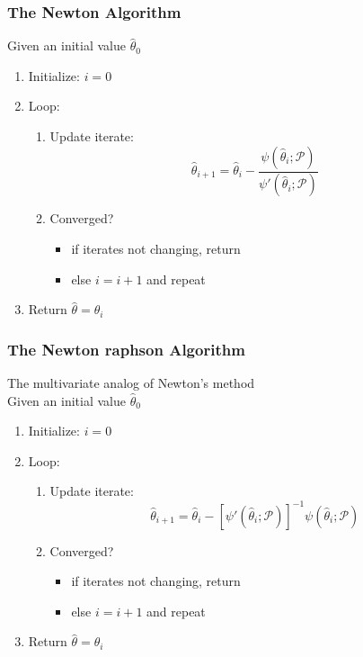 \documentclass[11pt]{article}
\begin{document}
\subsubsection*{The Newton Algorithm}
Given an initial value $\hat{\theta}_0$
\begin{enumerate}
    \item Initialize: $i=0$
    \item Loop:
    \begin{enumerate}
        \item Update iterate: \[\hat{\theta}_{i+1}=\hat{\theta}_i-\frac{\psi(\hat{\theta}_i;\mathcal{P})}{\psi'(\hat{\theta}_i;\mathcal{P})}\]
        \item Converged?
        \begin{itemize}
            \item if iterates not changing, return 
            \item else $i=i+1$ and repeat
        \end{itemize}
    \end{enumerate}
    \item Return $\hat{\theta}=\hat{\theta}_i$
\end{enumerate}
\subsubsection{The Newton raphson Algorithm}
The multivariate analog of Newton's method  \\ 
Given an initial value $\hat{\theta}_0$ 
\begin{enumerate}
    \item Initialize: $i=0$
    \item Loop:
    \begin{enumerate}
        \item Update iterate: \[\hat{\theta}_{i+1} = \hat{\theta}_i - [\psi'(\hat{\theta}_i;\mathcal{P})]^{-1}\psi(\hat{\theta}_i;\mathcal{P})\]    
        \item Converged?
        \begin{itemize}
            \item if iterates not changing, return
            \item else $i=i+1$ and repeat
        \end{itemize}
    \end{enumerate}
    \item Return $\hat{\theta}=\hat{\theta}_i$
\end{enumerate}
\end{document}

